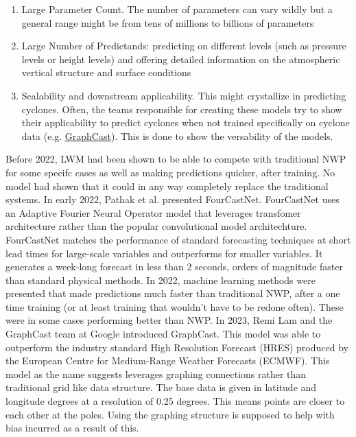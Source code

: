\begin{enumerate}[label = Rule \arabic*:]
    \item Large Parameter Count. The number of parameters can vary wildly but a general range might be from tens of millions to billions of parameters
    \item Large Number of Predictands: predicting on different levels (such as pressure levels or height levels) and offering detailed information on the atmospheric vertical structure and surface conditions
    \item Scalability and downstream applicability. This might crystallize in predicting cyclones. Often, the teams responsible for creating these models try to show their applicability to predict cyclones when not trained specifically on cyclone data (e.g.  \href{https://www.youtube.com/watch?v=PD1v5PCJs_o&ab_channel=GregBronevetsky}{GraphCast})\cite{SecondRevolution}. This is done to show the versability of the models.
\end{enumerate}
Before 2022, LWM had been shown to be able to compete with traditional NWP for some specifc cases as well as making predictions quicker, after training. No model had shown that it could in any way completely replace the traditional systems. In early 2022, Pathak et al.\cite{FourCastNet} presented FourCastNet. FourCastNet uses an Adaptive Fourier Neural Operator model that leverages transfomer architecture rather than the popular convolutional model architechture. FourCastNet matches the performance of standard forecasting techniques at short lead times for large-scale variables and outperforms for smaller variables. It generates a week-long forecast in less than 2 seconds, orders of magnitude faster than standard physical methods\cite{FourCastNet}. In 2022, machine learning methods were presented that made predictions much faster than traditional NWP, after a one time training (or at least training that wouldn't have to be redone often). These were in some cases performing better than NWP.  In 2023, Remi Lam and the GraphCast team at Google introduced GraphCast. This model was able to outperform the industry standard High Resolution Forecast (HRES) produced by the European Centre for Medium-Range Weather Forecasts (ECMWF). This model as the name suggests leverages graphing connections rather than traditional grid like data structure. The base data is given in latitude and longitude degrees at a resolution of 0.25 degrees. This means points are closer to each other at the poles. Using the graphing structure is supposed to help with bias incurred as a result of this\cite{GraphCast}.

